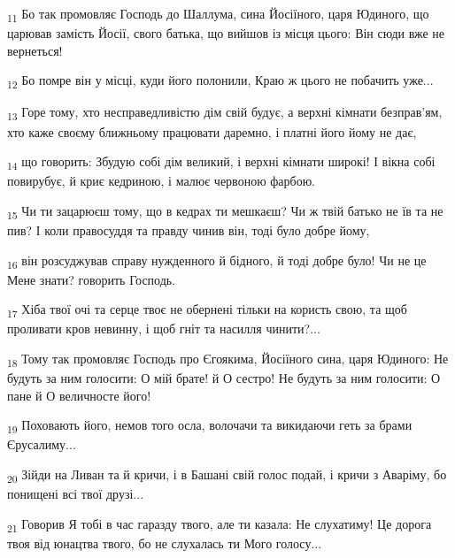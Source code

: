 \begin{tcolorbox}
\textsubscript{11} Бо так промовляє Господь до Шаллума, сина Йосіїного, царя Юдиного, що царював замість Йосії, свого батька, що вийшов із місця цього: Він сюди вже не вернеться!
\end{tcolorbox}
\begin{tcolorbox}
\textsubscript{12} Бо помре він у місці, куди його полонили, Краю ж цього не побачить уже...
\end{tcolorbox}
\begin{tcolorbox}
\textsubscript{13} Горе тому, хто несправедливістю дім свій будує, а верхні кімнати безправ'ям, хто каже своєму ближньому працювати даремно, і платні його йому не дає,
\end{tcolorbox}
\begin{tcolorbox}
\textsubscript{14} що говорить: Збудую собі дім великий, і верхні кімнати широкі! І вікна собі повирубує, й криє кедриною, і малює червоною фарбою.
\end{tcolorbox}
\begin{tcolorbox}
\textsubscript{15} Чи ти зацарюєш тому, що в кедрах ти мешкаєш? Чи ж твій батько не їв та не пив? І коли правосуддя та правду чинив він, тоді було добре йому,
\end{tcolorbox}
\begin{tcolorbox}
\textsubscript{16} він розсуджував справу нужденного й бідного, й тоді добре було! Чи не це Мене знати? говорить Господь.
\end{tcolorbox}
\begin{tcolorbox}
\textsubscript{17} Хіба твої очі та серце твоє не обернені тільки на користь свою, та щоб проливати кров невинну, і щоб гніт та насилля чинити?...
\end{tcolorbox}
\begin{tcolorbox}
\textsubscript{18} Тому так промовляє Господь про Єгоякима, Йосіїного сина, царя Юдиного: Не будуть за ним голосити: О мій брате! й О сестро! Не будуть за ним голосити: О пане й О величносте його!
\end{tcolorbox}
\begin{tcolorbox}
\textsubscript{19} Поховають його, немов того осла, волочачи та викидаючи геть за брами Єрусалиму...
\end{tcolorbox}
\begin{tcolorbox}
\textsubscript{20} Зійди на Ливан та й кричи, і в Башані свій голос подай, і кричи з Аваріму, бо понищені всі твої друзі...
\end{tcolorbox}
\begin{tcolorbox}
\textsubscript{21} Говорив Я тобі в час гаразду твого, але ти казала: Не слухатиму! Це дорога твоя від юнацтва твого, бо не слухалась ти Мого голосу...
\end{tcolorbox}
